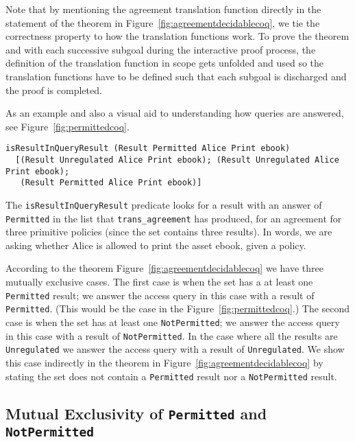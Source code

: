 \documentclass[conference]{IEEEtran}
\newcommand{\syn}{\texttt}
\begin{document}
Note that by mentioning the agreement translation function directly in the statement of the theorem in Figure~\ref{fig:agreementdecidablecoq}, we tie the correctness property to how the translation functions work. To prove the theorem and with each successive subgoal during the interactive proof process, the definition of the translation function in scope gets unfolded and used so the translation functions have to be defined such that each subgoal is discharged and the proof is completed. 


As an example and also a visual aid to understanding how queries are
answered, see Figure~\ref{fig:permittedcoq}.
%
\lstset{language=Coq, captionpos=b}
\begin{figure*}
\begin{lstlisting}
isResultInQueryResult (Result Permitted Alice Print ebook)
  [(Result Unregulated Alice Print ebook); (Result Unregulated Alice Print ebook);
   (Result Permitted Alice Print ebook)]
\end{lstlisting}
\caption{Access Request Resulting in Decision of \syn{Permitted}}
\label{fig:permittedcoq}
\end{figure*}
The \syn{isResultInQueryResult} predicate looks for a result with an
answer of \syn{Permitted} in the list that \syn{trans_agreement} has
produced, for an agreement for three primitive policies (since the set
contains three results). In words, we are asking whether Alice is
allowed to print the asset ebook, given a policy.
    
According to the theorem Figure~\ref{fig:agreementdecidablecoq} we have three mutually exclusive cases. The first case is when the set has a at least one \syn{Permitted} result; we answer the access query in this case with a result of \syn{Permitted}. (This would be the case in the Figure~\ref{fig:permittedcoq}.) The second case is when the set has at least one \syn{NotPermitted}; we answer the access query in this case with a result of \syn{NotPermitted}. In the case where all the results are \syn{Unregulated} we answer the access query with a result of \syn{Unregulated}. We show this case indirectly in the theorem in Figure~\ref{fig:agreementdecidablecoq} by stating the set does not contain a \syn{Permitted} result nor a \syn{NotPermitted} result. 

\subsection{Mutual Exclusivity of \syn{Permitted} and \syn{NotPermitted}}\label{sec:mutualexclusive}
\end{document}
